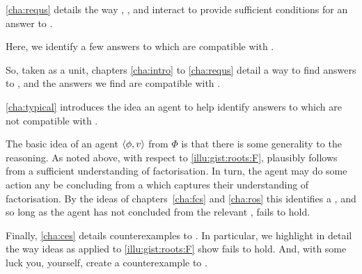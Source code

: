 \begin{note}
  \autoref{cha:requs} details the way , , and \progEx{} interact to provide sufficient conditions for an answer to \qWhy{}.

  Here, we identify a few answers to \qWhy{} which are compatible with \issueInclusion{}.

  So, taken as a unit, chapters \autoref{cha:intro} to \autoref{cha:requs} detail a way to find answers to \qWhy{}, and the answers we find are compatible with \issueInclusion{}.
\end{note}


\begin{note}
  \autoref{cha:typical} introduces the idea an agent \tCV{} to help identify answers to \qWhy{} which are not compatible with \issueInclusion{}.

  The basic idea of an agent \tCV{} \(\langle\phi, v\rangle\) from \(\Phi\) is that there is some generality to the \agents{} reasoning.
  As noted above, with respect to \autoref{illu:gist:roots:F},  plausibly follows from a sufficient understanding of factorisation.
  In turn, the agent may do some action any be concluding  from a \pool{} which captures their understanding of factorisation.
  By the ideas of chapters~\ref{cha:fcs} and \ref{cha:ros} this identifies a \fingfr{}, and so long as the agent has not concluded  from the relevant \pool{}, \issueInclusion{} fails to hold.
\end{note}


\begin{note}
  Finally, \autoref{cha:ces} details counterexamples to \issueInclusion{}.
  In particular, we highlight in detail the way ideas as applied to \autoref{illu:gist:roots:F} show \issueInclusion{} fails to hold.
  And, with some luck you, yourself, create a counterexample to \issueInclusion{}.
\end{note}

